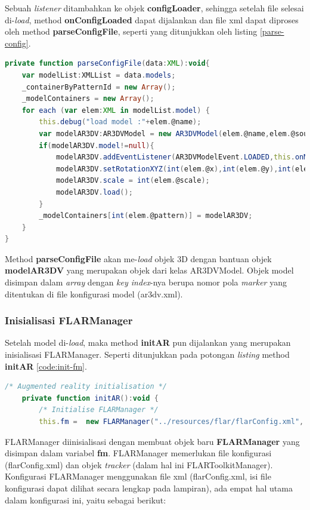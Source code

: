 Sebuah \textit{listener} ditambahkan ke objek \textbf{configLoader}, sehingga setelah file selesai di-\textit{load}, method \textbf{onConfigLoaded} dapat dijalankan dan file xml dapat diproses oleh method \textbf{parseConfigFile}, seperti yang ditunjukkan oleh listing \ref{parse-config}. 

\begin{lstlisting}[language=ActionScript,caption=Proses config file,label=parse-config]
private function parseConfigFile(data:XML):void{
	var modelList:XMLList = data.models;
	_containerByPatternId = new Array();
	_modelContainers = new Array();
	for each (var elem:XML in modelList.model) {
		this.debug("load model :"+elem.@name);
		var modelAR3DV:AR3DVModel = new AR3DVModel(elem.@name,elem.@source_dir,elem.@source,int(elem.@pattern),elem.@type);
		if(modelAR3DV.model!=null){
			modelAR3DV.addEventListener(AR3DVModelEvent.LOADED,this.onModelsLoaded);
			modelAR3DV.setRotationXYZ(int(elem.@x),int(elem.@y),int(elem.@z));
			modelAR3DV.scale = int(elem.@scale);
			modelAR3DV.load();
		}			
		_modelContainers[int(elem.@pattern)] = modelAR3DV;
	}
}
\end{lstlisting}

Method \textbf{parseConfigFile} akan me-\textit{load} objek 3D dengan bantuan objek \textbf{modelAR3DV} yang merupakan objek dari kelas AR3DVModel. Objek model disimpan dalam \textit{array} dengan \textit{key index}-nya berupa nomor pola \textit{marker} yang ditentukan di file konfigurasi model (ar3dv.xml).  

\subsubsection {Inisialisasi FLARManager}
\label{subsubsec:implementasi_inisialisasi_flarmanager}

Setelah model di-\textit{load}, maka method \textbf{initAR} pun dijalankan yang merupakan inisialisasi FLARManager. Seperti ditunjukkan pada potongan \textit{listing} method \textbf{initAR} \ref{code:init-fm}.

\begin{lstlisting}[language=ActionScript,caption=Init FLARManager,label=code:init-fm]
	/* Augmented reality initialisation */
	private function initAR():void {
		/* Initialise FLARManager */
		this.fm =  new FLARManager("../resources/flar/flarConfig.xml", new FLARToolkitManager(), this.stage);
\end{lstlisting}

FLARManager diinisialisasi dengan membuat objek baru \textbf{FLARManager} yang disimpan dalam variabel \textbf{fm}. FLARManager memerlukan file konfigurasi (flarConfig.xml) dan objek \textit{tracker} (dalam hal ini FLARToolkitManager). Konfigurasi FLARManager menggunakan file xml (flarConfig.xml, isi file konfigurasi dapat dilihat secara lengkap pada lampiran), ada empat hal utama dalam konfigurasi ini, yaitu sebagai berikut:

